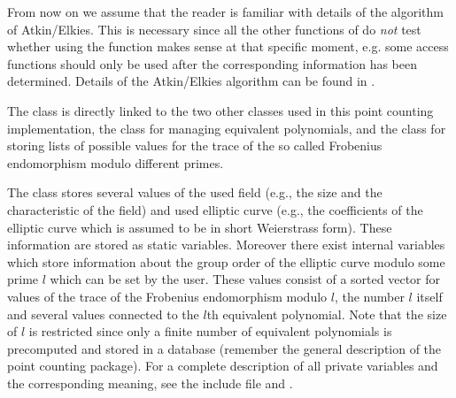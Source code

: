 From now on we assume that the reader is familiar with details of the algorithm of Atkin/Elkies.
This is necessary since all the other functions of  do \emph{not} test whether
using the function makes sense at that specific moment, e.g. some access functions should only
be used after the corresponding information has been determined.  Details of the Atkin/Elkies
algorithm can be found in \cite{MuellerV_Thesis:1995}.

The class  is directly linked to the two other classes used in this point
counting implementation, the class  for managing equivalent polynomials, and the
class  for storing lists of possible values for the trace of the so called
Frobenius endomorphism modulo different primes.

The class  stores several values of the used field (e.g., the size and the
characteristic of the field) and used elliptic curve (e.g., the coefficients of the elliptic
curve which is assumed to be in short Weierstrass form).  These information are stored as static
variables.  Moreover there exist internal variables which store information about the group
order of the elliptic curve modulo some prime $l$ which can be set by the user.  These values
consist of a sorted vector for values of the trace of the Frobenius endomorphism modulo $l$, the
number $l$ itself and several values connected to the $l$th equivalent polynomial.  Note that
the size of $l$ is restricted since only a finite number of equivalent polynomials is
precomputed and stored in a database (remember the general description of the point counting
package).  For a complete description of all private variables and the corresponding meaning,
see the include file  and \cite{MuellerV_Thesis:1995}.

